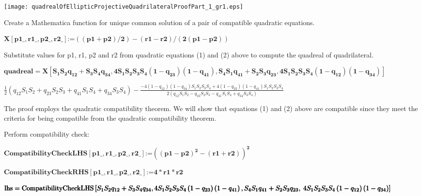 \documentclass{article}
\begin{document}
\texttt{[image: quadrealOfEllipticProjectiveQuadrilateralProofPart\_1\_gr1.eps]}

Create a Mathematica function for unique common solution of a pair of compatible quadratic equations.

\begin{doublespace}
\noindent\(\pmb{X[\text{p1$\_$},\text{r1$\_$},\text{p2$\_$},\text{r2$\_$}]\text{:=}((\text{p1}+\text{p2})/2)-(\text{r1}-\text{r2})/(2(\text{p1}-\text{p2}))}\)
\end{doublespace}

Substitute values for p1, r1, p2 and r2 from quadratic equations (1) and (2) above to compute the quadreal of quadrilateral.

\begin{doublespace}
\noindent\(\pmb{\text{quadreal}=X\left[S_1S_2q_{12}+S_3S_4q_{34},4S_1S_2S_3S_4\left(1-q_{23}\right)\left(1-q_{41}\right),S_4S_1q_{41}+S_2S_3q_{23},4S_1S_2S_3S_4\left(1-q_{12}\right)\left(1-q_{34}\right)\right]}\)
\end{doublespace}

\begin{doublespace}
\noindent\(\frac{1}{2} \left(q_{12} S_1 S_2+q_{23} S_2 S_3+q_{41} S_1 S_4+q_{34} S_3 S_4\right)-\frac{-4 \left(1-q_{12}\right) \left(1-q_{34}\right)
S_1 S_2 S_3 S_4+4 \left(1-q_{23}\right) \left(1-q_{41}\right) S_1 S_2 S_3 S_4}{2 \left(q_{12} S_1 S_2-q_{23} S_2 S_3-q_{41} S_1 S_4+q_{34} S_3 S_4\right)}\)
\end{doublespace}



The proof employs the quadratic compatibility theorem. We will show that equations (1) and (2) above are compatible since they meet the criteria
for being compatible from the quadratic compatibility theorem. 

Perform compatibility check:

\begin{doublespace}
\noindent\(\pmb{\text{CompatibilityCheckLHS} [\text{p1$\_$},\text{r1$\_$},\text{p2$\_$},\text{r2$\_$}]\text{:=}\left((\text{p1}-\text{p2})^2-(\text{r1}+\text{r2})\right)^2}\)
\end{doublespace}

\begin{doublespace}
\noindent\(\pmb{\text{CompatibilityCheckRHS} [\text{p1$\_$},\text{r1$\_$},\text{p2$\_$},\text{r2$\_$}]\text{:=} 4*\text{r1}*\text{r2}}\)
\end{doublespace}

\begin{doublespace}
\noindent\(\pmb{\text{lhs} = \text{CompatibilityCheckLHS}\left[S_1S_2q_{12}+S_3S_4q_{34},4S_1S_2S_3S_4\left(1-q_{23}\right)\left(1-q_{41}\right),S_4S_1q_{41}+S_2S_3q_{23},\right.}\\
\pmb{\left.4S_1S_2S_3S_4\left(1-q_{12}\right)\left(1-q_{34}\right)\right]}\)
\end{doublespace}
\end{document}

